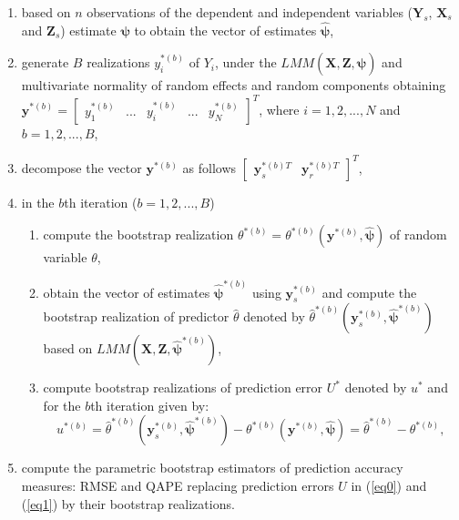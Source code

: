 \begin{enumerate}
	\item based on $n$ observations of the dependent and independent variables ($\mathbf{Y}_s$, $\mathbf{X}_s$ and $\mathbf{Z}_s$) estimate $\boldsymbol{\psi}$ to obtain the vector of estimates $\boldsymbol{\hat{\psi}}$,
	\item generate $B$ realizations $y_{i}^{*(b)}$ of $Y_{i}$, under the $LMM(\mathbf{X}, \mathbf{Z}, \hat{\boldsymbol{\psi}})$ and multivariate normality of random effects and random components obtaining\\
	$\mathbf{y}^{*(b)}=\begin{bmatrix}	
	y_{1}^{*(b)} & ... & y_{i}^{*(b)} &... & y_{N}^{*(b)}
	\end{bmatrix}^T$, where $i=1, 2, ... ,N$ and $b=1, 2, ... ,B$,
	\item decompose the vector $\mathbf{y}^{*(b)}$ as follows
	$\begin{bmatrix}
		\mathbf{y}_s^{*(b)T} & \mathbf{y}_r^{*(b)T}
	\end{bmatrix}^T$,
	\item	in the $b$th iteration ($b=1,2,...,B$)
	\begin{enumerate}
		\item compute the bootstrap realization $\theta^{*(b)}=\theta^{*(b)}(\mathbf{y}^{*(b)},\boldsymbol{\hat{\psi}})$ of random variable $\theta$,
		\item obtain the vector of estimates $\boldsymbol{\hat{\psi}}^{*(b)}$ using $\mathbf{y}_s^{*(b)}$ and compute the bootstrap realization of predictor $\hat{\theta}$ denoted by $\hat{\theta}^{*(b)}(\mathbf{y}_s^{*(b)},\boldsymbol{\hat{\psi}}^{*(b)})$ based on $LMM(\mathbf{X}, \mathbf{Z}, \boldsymbol{\hat{\psi}}^{*(b)})$,
		\item compute bootstrap realizations of prediction error $U^*$ denoted by $u^*$ and for the $b$th iteration given by:
		\begin{equation}\label{u*b}
			u^{*(b)}=\hat{\theta}^{*(b)}(\mathbf{y}_s^{*(b)},\boldsymbol{\hat{\psi}}^{*(b)})-\theta^{*(b)}
			(\mathbf{y}^{*(b)},\boldsymbol{\hat{\psi}}) =\hat{\theta}^{*(b)}-\theta^{*(b)},
		\end{equation}
	\end{enumerate}
	\item compute the parametric bootstrap estimators of prediction accuracy measures: RMSE and QAPE replacing prediction errors $U$ in (\ref{eq0}) and (\ref{eq1}) by their bootstrap realizations.
\end{enumerate}
	
